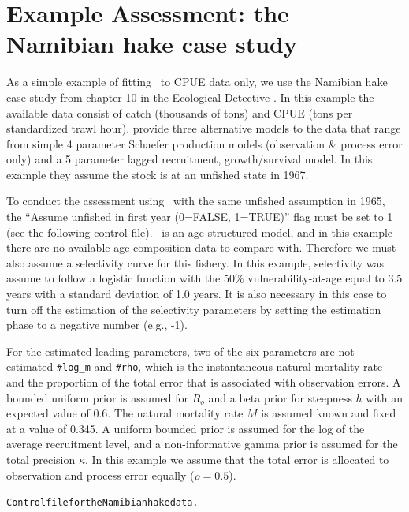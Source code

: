 \section{Example Assessment: the Namibian hake case study}
\begin{multicols}{2}
As a simple example of fitting \iscam\ to CPUE data only, we use the Namibian hake case study from chapter 10 in the Ecological Detective \citep{hilborn1997ecological}.  In this example the available data consist of catch (thousands of tons) and CPUE (tons per standardized trawl hour).  \cite{hilborn1997ecological} provide three alternative models to the data that range from simple 4 parameter Schaefer production models (observation \& process error only) and a 5 parameter lagged recruitment, growth/survival model.  In this example they assume the stock is at an unfished state in 1967.

To conduct the assessment using \iscam\ with the same unfished assumption in 1965, the 			``Assume unfished in first year (0=FALSE, 1=TRUE)'' flag must be set to 1 (see the following control file). \iscam\ is an age-structured model, and in this example there are no available age-composition data to compare with. Therefore we must also assume a selectivity curve for this fishery.  In this example, selectivity was assume to follow a logistic function with the 50\% vulnerability-at-age equal to 3.5 years with a standard deviation of  1.0 years.  It is also necessary in this case to turn off the estimation of the selectivity parameters by setting the estimation phase to a negative number (e.g., -1).  

For the estimated leading parameters, two of the six parameters are not estimated \verb"#log_m" and \verb"#rho", which is the instantaneous natural mortality rate and the proportion of the total error that is associated with observation errors.  A bounded uniform prior is assumed for $R_o$ and a beta prior for steepness $h$ with an expected value of 0.6.  The natural mortality rate $M$ is assumed known and fixed at a value of 0.345.  A uniform bounded prior is assumed for the log of the average recruitment level, and a non-informative gamma prior is assumed for the total precision $\kappa$.  In this example we assume that the total error is allocated to observation and process error equally ($\rho= 0.5$).

\tiny
\noindent \hrulefill
\begin{alltt}
Control file for the Namibian hake data.

\end{alltt}
\hrulefill
\normalsize


\end{multicols}
